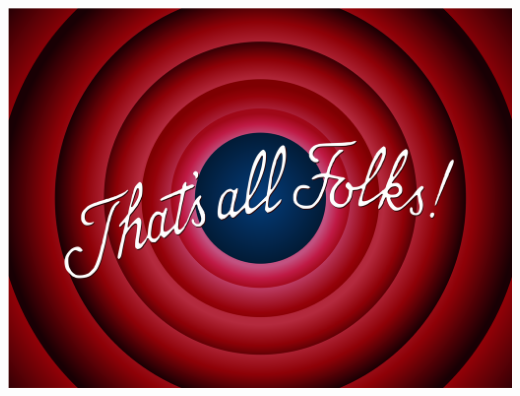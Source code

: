 \documentclass{beamer}
\begin{document}
\begin{frame}
	\includegraphics[width=\linewidth]{Thats_all_folks.png}
\end{frame}
\end{document}
